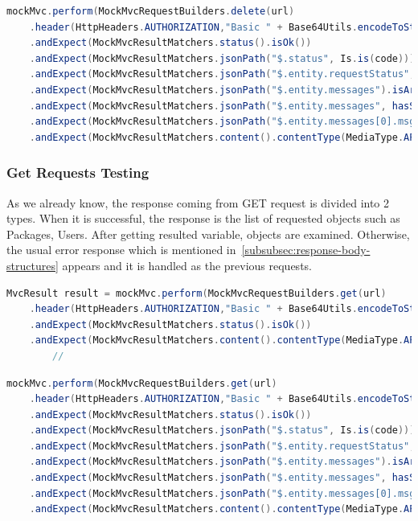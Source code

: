 \begin{lstlisting}[language={JAVA}]
mockMvc.perform(MockMvcRequestBuilders.delete(url)
    .header(HttpHeaders.AUTHORIZATION,"Basic " + Base64Utils.encodeToString("admin:password".getBytes())))
    .andExpect(MockMvcResultMatchers.status().isOk())
    .andExpect(MockMvcResultMatchers.jsonPath("$.status", Is.is(code)))
    .andExpect(MockMvcResultMatchers.jsonPath("$.entity.requestStatus", Is.is(requestStatus)))
    .andExpect(MockMvcResultMatchers.jsonPath("$.entity.messages").isArray())
    .andExpect(MockMvcResultMatchers.jsonPath("$.entity.messages", hasSize(1)))
    .andExpect(MockMvcResultMatchers.jsonPath("$.entity.messages[0].msgText", Is.is(message)))
    .andExpect(MockMvcResultMatchers.content().contentType(MediaType.APPLICATION_JSON));

\end{lstlisting}

\subsubsection{Get Requests Testing}
As we already know, the response coming from GET request is divided into 2 types. When it is successful, the response is the list of requested objects such as Packages, Users. After getting resulted variable, objects are examined. Otherwise, the usual error response which is mentioned in~\autoref{subsubsec:response-body-structures} appears and it is handled as the previous requests.

\begin{lstlisting}[language={JAVA}]
MvcResult result = mockMvc.perform(MockMvcRequestBuilders.get(url)
    .header(HttpHeaders.AUTHORIZATION,"Basic " + Base64Utils.encodeToString("admin:password".getBytes())))
    .andExpect(MockMvcResultMatchers.status().isOk())
    .andExpect(MockMvcResultMatchers.content().contentType(MediaType.APPLICATION_JSON)).andReturn();
        //
\end{lstlisting}

\begin{lstlisting}[language={JAVA}]
mockMvc.perform(MockMvcRequestBuilders.get(url)
    .header(HttpHeaders.AUTHORIZATION,"Basic " + Base64Utils.encodeToString("admin:password".getBytes())))
    .andExpect(MockMvcResultMatchers.status().isOk())
    .andExpect(MockMvcResultMatchers.jsonPath("$.status", Is.is(code)))
    .andExpect(MockMvcResultMatchers.jsonPath("$.entity.requestStatus", Is.is(requestStatus)))
    .andExpect(MockMvcResultMatchers.jsonPath("$.entity.messages").isArray())
    .andExpect(MockMvcResultMatchers.jsonPath("$.entity.messages", hasSize(1)))
    .andExpect(MockMvcResultMatchers.jsonPath("$.entity.messages[0].msgText", Is.is(message)))
    .andExpect(MockMvcResultMatchers.content().contentType(MediaType.APPLICATION_JSON));
\end{lstlisting}

